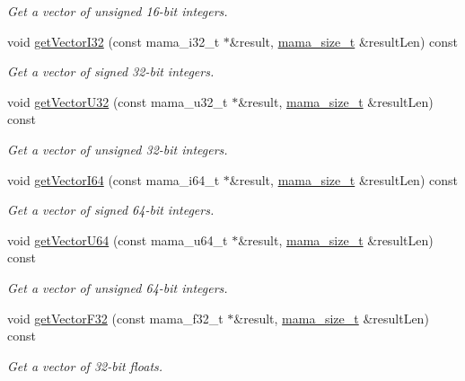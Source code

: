 \begin{DoxyCompactItemize}
\begin{DoxyCompactList}\small\item\em Get a vector of unsigned 16-\/bit integers. \item\end{DoxyCompactList}\item 
void \hyperlink{classWombat_1_1MamaMsgField_accae64c2f6040e208cf7feb405514eaa}{getVectorI32} (const mama\_\-i32\_\-t $\ast$\&result, \hyperlink{classmama__size__t}{mama\_\-size\_\-t} \&resultLen) const 
\begin{DoxyCompactList}\small\item\em Get a vector of signed 32-\/bit integers. \item\end{DoxyCompactList}\item 
void \hyperlink{classWombat_1_1MamaMsgField_a6f6297335f81da3243e1d3ccc3db9223}{getVectorU32} (const mama\_\-u32\_\-t $\ast$\&result, \hyperlink{classmama__size__t}{mama\_\-size\_\-t} \&resultLen) const 
\begin{DoxyCompactList}\small\item\em Get a vector of unsigned 32-\/bit integers. \item\end{DoxyCompactList}\item 
void \hyperlink{classWombat_1_1MamaMsgField_afe58f6065e1dc03bdab9d83882393b68}{getVectorI64} (const mama\_\-i64\_\-t $\ast$\&result, \hyperlink{classmama__size__t}{mama\_\-size\_\-t} \&resultLen) const 
\begin{DoxyCompactList}\small\item\em Get a vector of signed 64-\/bit integers. \item\end{DoxyCompactList}\item 
void \hyperlink{classWombat_1_1MamaMsgField_a9f3ad41fef1e9dcf8369f86a9d2be18d}{getVectorU64} (const mama\_\-u64\_\-t $\ast$\&result, \hyperlink{classmama__size__t}{mama\_\-size\_\-t} \&resultLen) const 
\begin{DoxyCompactList}\small\item\em Get a vector of unsigned 64-\/bit integers. \item\end{DoxyCompactList}\item 
void \hyperlink{classWombat_1_1MamaMsgField_ae3721635ea8bfa48ba174a2ebc81c00d}{getVectorF32} (const mama\_\-f32\_\-t $\ast$\&result, \hyperlink{classmama__size__t}{mama\_\-size\_\-t} \&resultLen) const 
\begin{DoxyCompactList}\small\item\em Get a vector of 32-\/bit floats. \item\end{DoxyCompactList}\item 

\end{DoxyCompactItemize}
